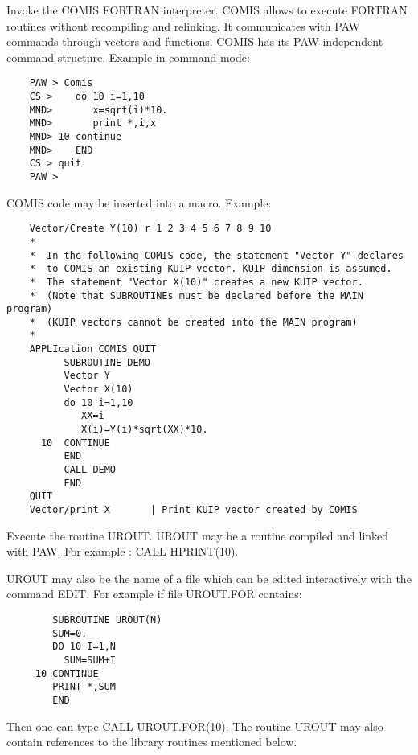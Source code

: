    \par
Invoke the COMIS FORTRAN interpreter.  COMIS allows to execute FORTRAN 
   routines without recompiling and relinking. It communicates with PAW 
   commands through vectors and functions. COMIS has its PAW-independent 
   command structure.  Example in command mode:  
\begin{verbatim}
    PAW > Comis
    CS >    do 10 i=1,10
    MND>       x=sqrt(i)*10.
    MND>       print *,i,x
    MND> 10 continue
    MND>    END
    CS > quit
    PAW >
\end{verbatim}
   \par
COMIS code may be inserted into a macro. Example:  
\begin{verbatim}
    Vector/Create Y(10) r 1 2 3 4 5 6 7 8 9 10
    *
    *  In the following COMIS code, the statement "Vector Y" declares
    *  to COMIS an existing KUIP vector. KUIP dimension is assumed.
    *  The statement "Vector X(10)" creates a new KUIP vector.
    *  (Note that SUBROUTINEs must be declared before the MAIN program)
    *  (KUIP vectors cannot be created into the MAIN program)
    *
    APPLIcation COMIS QUIT
          SUBROUTINE DEMO
          Vector Y
          Vector X(10)
          do 10 i=1,10
             XX=i
             X(i)=Y(i)*sqrt(XX)*10.
      10  CONTINUE
          END
          CALL DEMO
          END
    QUIT
    Vector/print X       | Print KUIP vector created by COMIS
\end{verbatim}

\ENDCMD


\BEGARG
{}
\ENDARG

   \par
Execute the routine UROUT.  UROUT may be a routine compiled and linked with 
   PAW.  For example : CALL HPRINT(10).  

   \par
UROUT may also be the name of a file which can be edited interactively with 
   the command EDIT. For example if file UROUT.FOR contains:  
\begin{verbatim}
        SUBROUTINE UROUT(N)
        SUM=0.
        DO 10 I=1,N
          SUM=SUM+I
     10 CONTINUE
        PRINT *,SUM
        END
\end{verbatim}
   \par
Then one can type CALL UROUT.FOR(10). The routine UROUT may also contain 
   references to the library routines mentioned below.  

